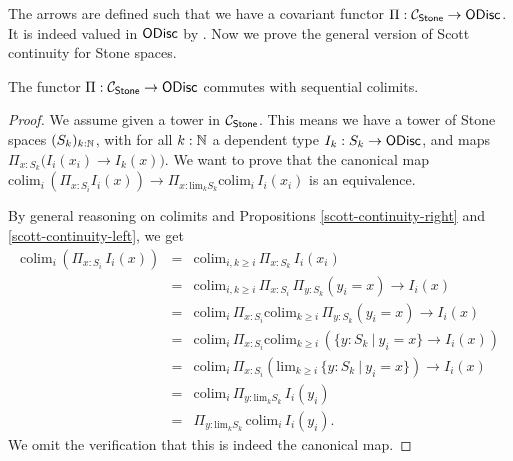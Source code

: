 The arrows are defined such that we have a covariant functor $\Pi:{\mathcal C}_{\mathsf{Stone}}\to \mathsf{ODisc}$. It is indeed valued in $\mathsf{ODisc}$ by . Now we prove the general version of Scott continuity for Stone spaces.

\begin{theorem}\label{eine-scott-continuity-stone}
The functor $\Pi : {\mathcal C}_{\mathsf{Stone}} \to \mathsf{ODisc}$ commutes with sequential colimits.
\end{theorem}

\begin{proof}
  We assume given a tower in ${\mathcal C}_{\mathsf{Stone}}$.  This means we have a tower of Stone spaces $(S_k)_{k:\mathbb{N}}$, 
 with for all $k:\mathbb{N}$ a dependent type $I_k:S_k\to \mathsf{ODisc}$, 
and maps $\Pi_{x:S_{k}}\big(I_i(x_i)\to I_{k}(x)\big).$
We want to prove that the canonical map $\mathrm{colim}_i\, (\Pi_{x:S_i}I_i(x)) \to \Pi_{x:\mathrm{lim}_kS_k}\mathrm{colim}_i\, I_i(x_i)$ is an equivalence. 

By general reasoning on colimits and Propositions \ref{scott-continuity-right} and \ref{scott-continuity-left}, we get
\begin{eqnarray}
\mathrm{colim}_i\, (\Pi_{x:S_i}\,I_i(x)) &=& \mathrm{colim}_{i,k\geq i}\, \Pi_{x:S_k}\, I_i(x_i)\nonumber\\
&=& \mathrm{colim}_{i,k\geq i}\, \Pi_{x:S_i}\,\Pi_{y:S_k} (y_i=x)\to I_i(x) \nonumber\\
&=& \mathrm{colim}_i\,\Pi_{x:S_i} \mathrm{colim}_{k\geq i}\, \Pi_{y:S_k} (y_i=x)\to I_i(x)\nonumber\\
&=& \mathrm{colim}_i\,\Pi_{x:S_i} \mathrm{colim}_{k\geq i}\, (\{y:S_k\ |\ y_i=x\} \to I_i(x))\nonumber\\
&=& \mathrm{colim}_i\,\Pi_{x:S_i} (\mathrm{lim}_{k\geq i}\, \{y:S_k\ |\ y_i=x\}) \to I_i(x)\nonumber\\
&=& \mathrm{colim}_i\,\Pi_{y:\mathrm{lim}_{k}S_k}\, I_i(y_i)\nonumber\\
&=& \Pi_{y:\mathrm{lim}_{k}S_k}\, \mathrm{colim}_i\, I_i(y_i).\nonumber
\end{eqnarray}
We omit the verification that this is indeed the canonical map.
\end{proof}



